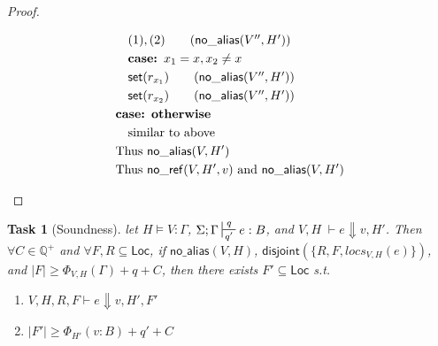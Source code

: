\documentclass[11pt]{article}
\newcounter{group}
\newtheorem{theorem}{Task}[group]
\newcommand{\ms}[1]{\ensuremath{\mathsf{#1}}}
\newcommand{\na}[1]{\mathsf{no\_alias}(#1)}
\newcommand{\nr}[1]{\mathsf{no\_ref}(#1)}
\newcommand{\dist}[1]{\mathsf{disjoint}(#1)}
\begin{document}
\begin{proof}
\begin{description}
\begin{align*}
  &\quad (1), (2) \tag{$\na{V'',H'}$}\\
  &\quad \textbf{case: } x_1 = x, x_2 \ne x\\
  &\quad \ms{set}(r_{x_1}) \tag{$\na{V'',H'}$}\\
  &\quad \ms{set}(r_{x_2}) \tag{$\na{V'',H'}$}\\
  &\textbf{case: otherwise}\\ 
  &\quad \text{similar to above}\\
  &\text{Thus } \na{V,H'}\\
  &\text{Thus } \nr{V,H',v} \text{ and } \na{V,H'}\\
  \end{align*}
  \end{description}
\end{proof}

\begin{theorem}[Soundness]
\label{b} let $H \vDash V : \Gamma$, $\Sigma; \Gamma \sststile{q'}{q} e : B$,
and $V,H \; \vdash e \Downarrow v, H'$. Then $\forall C \in \mathbb{Q}^{+}$ and $\forall F,R \subseteq \ms{Loc}$,  if $\na{V,H}$, $\dist{\{R,F,locs_{V,H}(e)\}}$, and $|F| \ge \Phi_{V,H}(\Gamma) + q + C$, then there exists $F' \subseteq \ms{Loc}$ s.t.
\begin{enumerate}
  \item $V,H,R,F \vdash e \Downarrow v, H', F'$
  \item $|F'| \ge \Phi_{H'}(v:B) + q' + C$
\end{enumerate}
\end{theorem}
\end{document}
